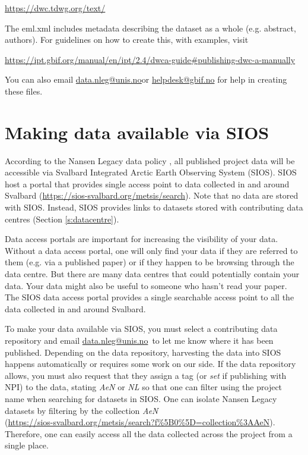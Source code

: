 \documentclass[a4paper,english, 11pt]{article}
\makeatletter
\newcommand{\emailme}{\href{mailto:data.nleg@unis.no}{data.nleg@unis.no}}
\makeatother
\begin{document}
\url{https://dwc.tdwg.org/text/}

The eml.xml includes metadata describing the dataset as a whole (e.g. abstract, authors). For guidelines on how to create this, with examples, visit

\url{https://ipt.gbif.org/manual/en/ipt/2.4/dwca-guide#publishing-dwc-a-manually}

You can also email \emailme or \href{mailto:helpdesk@gbif.no}{helpdesk@gbif.no} for help in creating these files.

\newpage
\section{Making data available via SIOS}
\label{s:SIOS}

According to the Nansen Legacy data policy \citep{aendatapolicy2021}, all published project data will be accessible via Svalbard Integrated Arctic Earth Observing System (SIOS). SIOS host a portal that provides single access point to data collected in and around Svalbard (\url{https://sios-svalbard.org/metsis/search}).
Note that no data are stored with SIOS. Instead, SIOS provides links to datasets stored with contributing data centres (Section \ref{s:datacentre}). 

Data access portals are important for increasing the visibility of your data. Without a data access portal, one will only find your data if they are referred to them (e.g. via a published paper) or if they happen to be browsing through the data centre. But there are many data centres that could potentially contain your data. Your data might also be useful to someone who hasn't read your paper. The SIOS data access portal provides a single searchable access point to all the data collected in and around Svalbard.

To make your data available via SIOS, you must select a contributing data repository and email \emailme \ to let me know where it has been published. Depending on the data repository, harvesting the data into SIOS happens automatically or requires some work on our side. If the data repository allows, you must also request that they assign a tag (or \textit{set} if publishing with NPI) to the data, stating \textit{AeN} or \textit{NL} so that one can filter using the project name when searching for datasets in SIOS. One can isolate Nansen Legacy datasets by filtering by the collection \textit{AeN} \\ 
(\url{https://sios-svalbard.org/metsis/search?f%5B0%5D=collection%3AAeN}). 
Therefore, one can easily access all the data collected across the project from a single place.  
\end{document}
